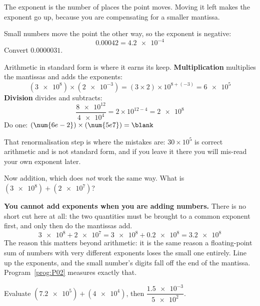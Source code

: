 \begin{fr}
The exponent is the number of places the point moves. Moving it left makes the
exponent go up, because you are compensating for a smaller mantissa.

Small numbers move the point the other way, so the exponent is negative:
\[ \num{0.00042} = \num{4.2e-4} \]
Convert $\num{0.0000031}$.
\nextframe
\end{fr}

\begin{fr}
Arithmetic in standard form is where it earns its keep. \textbf{Multiplication}
multiplies the mantissas and adds the exponents:
\[ (\num{3e8}) \times (\num{2e-3})
   = (3 \times 2) \times 10^{8 + (-3)} = \num{6e5} \]
\textbf{Division} divides and subtracts:
\[ \frac{\num{8e12}}{\num{4e4}} = 2 \times 10^{12-4} = \num{2e8} \]
Do one: $(\num{6e-2}) \times (\num{5e7}) = \blank$
\nextframe
\end{fr}

\begin{fr}
That renormalisation step is where the mistakes are: $30 \times 10^{5}$ is
correct arithmetic and is not standard form, and if you leave it there you will
mis-read your own exponent later.

Now addition, which does \emph{not} work the same way. What is
$(\num{3e8}) + (\num{2e7})$?
\nextframe
\end{fr}

\begin{fr}
\begin{trapbox}
\textbf{You cannot add exponents when you are adding numbers.} There is no
short cut here at all: the two quantities must be brought to a common exponent
first, and only then do the mantissas add.
\[ \num{3e8} + \num{2e7} = \num{3e8} + \num{0.2e8} = \num{3.2e8} \]
The reason this matters beyond arithmetic: it is the same reason a
floating-point sum of numbers with very different exponents loses the small one
entirely. Line up the exponents, and the small number's digits fall off the end
of the mantissa. Program~\ref{prog:P02} measures exactly that.
\end{trapbox}

\yourturn
Evaluate $(\num{7.2e5}) + (\num{4e4})$, then
$\dfrac{\num{1.5e-3}}{\num{5e2}}$.
\dotline
\nextframe
\end{fr}

